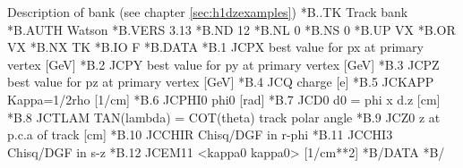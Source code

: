 \begin{XMPt}{Description of  bank (see chapter \ref{sec:h1dzexamples})}
*B..TK     Track bank
*B.AUTH    Watson
*B.VERS    3.13
*B.ND      12
*B.NL      0
*B.NS      0
*B.UP      VX
*B.OR      VX
*B.NX      TK
*B.IO      F
*B.DATA
*B.1      JCPX       best value for px at primary vertex    [GeV]
*B.2      JCPY       best value for py at primary vertex    [GeV]
*B.3      JCPZ       best value for pz at primary vertex    [GeV]
*B.4      JCQ        charge                                 [e]
*B.5      JCKAPP     Kappa=1/2rho                           [1/cm]
*B.6      JCPHI0     phi0                                   [rad]
*B.7      JCD0       d0 = phi x d.z                         [cm]
*B.8      JCTLAM     TAN(lambda) = COT(theta) track polar angle
*B.9      JCZ0       z at p.c.a of track                    [cm]
*B.10     JCCHIR     Chisq/DGF in r-phi
*B.11     JCCHI3     Chisq/DGF in s-z
*B.12     JCEM11     <kappa0 kappa0>                    [1/cm**2]
*B/DATA
*B/
\end{XMPt}

\finalnewpage

